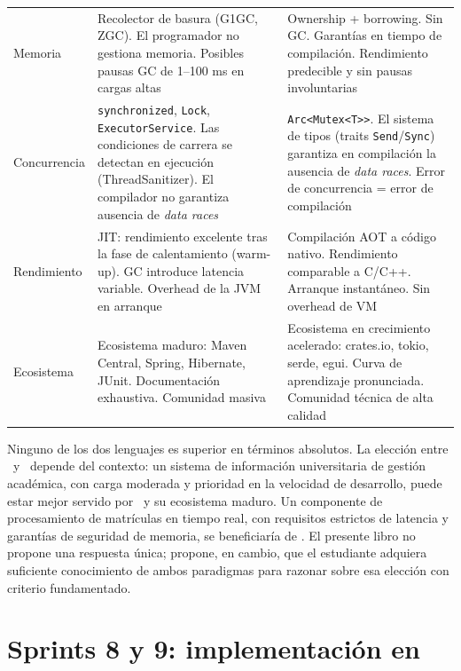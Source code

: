 \begin{longtable}{@{}L{2.5cm}L{5cm}L{5cm}@{}}
\addlinespace
Memoria &
  Recolector de basura (G1GC, ZGC). El programador no gestiona memoria.
  Posibles pausas GC de 1--100 ms en cargas altas &
  Ownership + borrowing. Sin GC. Garantías en tiempo de compilación.
  Rendimiento predecible y sin pausas involuntarias \\
\addlinespace
Concurrencia &
  \texttt{synchronized}, \texttt{Lock}, \texttt{ExecutorService}.
  Las condiciones de carrera se detectan en ejecución (ThreadSanitizer).
  El compilador no garantiza ausencia de \textit{data races} &
  \texttt{Arc\textless Mutex\textless T\textgreater\textgreater}. El sistema de tipos (traits \texttt{Send}/\texttt{Sync})
  garantiza en compilación la ausencia de \textit{data races}.
  Error de concurrencia = error de compilación \\
\addlinespace
Rendimiento &
  JIT: rendimiento excelente tras la fase de calentamiento (warm-up).
  GC introduce latencia variable. Overhead de la JVM en arranque &
  Compilación AOT a código nativo. Rendimiento comparable a C/C++.
  Arranque instantáneo. Sin overhead de VM \\
\addlinespace
Ecosistema &
  Ecosistema maduro: Maven Central, Spring, Hibernate, JUnit.
  Documentación exhaustiva. Comunidad masiva &
  Ecosistema en crecimiento acelerado: crates.io, tokio, serde, egui.
  Curva de aprendizaje pronunciada. Comunidad técnica de alta calidad \\
\end{longtable}

\noindent
Ninguno de los dos lenguajes es superior en términos absolutos. La elección entre
\java\ y \rust\ depende del contexto: un sistema de información universitaria de
gestión académica, con carga moderada y prioridad en la velocidad de desarrollo,
puede estar mejor servido por \java\ y su ecosistema maduro. Un componente de
procesamiento de matrículas en tiempo real, con requisitos estrictos de latencia y
garantías de seguridad de memoria, se beneficiaría de \rust. El presente libro no
propone una respuesta única; propone, en cambio, que el estudiante adquiera
suficiente conocimiento de ambos paradigmas para razonar sobre esa elección con
criterio fundamentado.

\section*{Sprints 8 y 9: implementación en \rust}
\label{sec:sprints-8-9}

